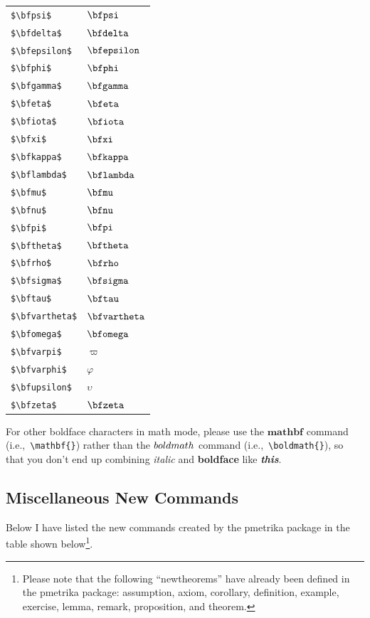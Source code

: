 \documentclass[titlepage,12pt]{article}
\begin{document}
\begin{longtable}{l@{\qquad}l}
\verb=$\bfpsi$= & $\bfpsi$ \\
\verb=$\bfdelta$= & $\bfdelta$ \\
\verb=$\bfepsilon$= & $\bfepsilon$ \\
\verb=$\bfphi$= & $\bfphi$ \\
\verb=$\bfgamma$= & $\bfgamma$ \\
\verb=$\bfeta$= & $\bfeta$ \\
\verb=$\bfiota$= & $\bfiota$ \\
\verb=$\bfxi$= & $\bfxi$ \\
\verb=$\bfkappa$= & $\bfkappa$ \\
\verb=$\bflambda$= & $\bflambda$ \\
\verb=$\bfmu$= & $\bfmu$ \\
\verb=$\bfnu$= & $\bfnu$ \\
\verb=$\bfpi$= & $\bfpi$ \\
\verb=$\bftheta$= & $\bftheta$ \\
\verb=$\bfrho$= & $\bfrho$ \\
\verb=$\bfsigma$= & $\bfsigma$ \\
\verb=$\bftau$= & $\bftau$ \\
\verb=$\bfvartheta$= & $\bfvartheta$ \\
\verb=$\bfomega$= & $\bfomega$ \\
\verb=$\bfvarpi$= & $\varpi$ \\
\verb=$\bfvarphi$= & $\varphi$ \\
\verb=$\bfupsilon$= & $\upsilon$ \\
\verb=$\bfzeta$= & $\bfzeta$ \\ \hline
\end{longtable}

\vskip6pt

For other boldface characters in math mode, please use the
$\mathbf{mathbf}$ command (i.e.,~\verb=\mathbf{}=) rather than the
$\boldmath{boldmath}$ command (i.e.,~\verb=\boldmath{}=), so that
you don't end up combining \textit{italic} and \textbf{boldface}
like {\bf \textit{this}}.

\subsection{Miscellaneous New Commands}

Below I have listed the new commands created by the pmetrika
package in the table shown below\footnote{Please note that the
following ``newtheorems'' have already been defined in the
pmetrika package: assumption, axiom, corollary, definition,
example, exercise, lemma, remark, proposition, and theorem.}.
\end{document}
